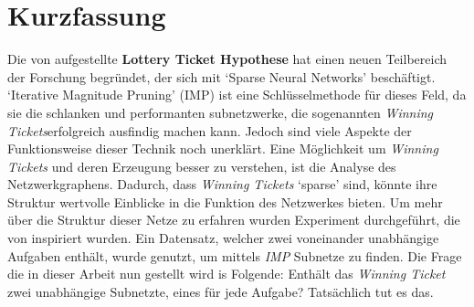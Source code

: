 \chapter*{Kurzfassung}

Die von \textcite{LTH} aufgestellte \textbf{Lottery Ticket Hypothese} hat einen neuen Teilbereich der Forschung begründet, der sich mit `Sparse Neural Networks' beschäftigt.
`Iterative Magnitude Pruning' (IMP) ist eine Schlüsselmethode für dieses Feld, da sie die schlanken und performanten subnetzwerke, die sogenannten \textit{Winning Tickets}erfolgreich ausfindig machen kann.
Jedoch sind viele Aspekte der Funktionsweise dieser Technik noch unerklärt.
Eine Möglichkeit um \textit{Winning Tickets} und deren Erzeugung besser zu verstehen, ist die Analyse des Netzwerkgraphens.
Dadurch, dass \textit{Winning Tickets} `sparse' sind, könnte ihre Struktur wertvolle Einblicke in die Funktion des Netzwerkes bieten.
Um mehr über die Struktur dieser Netze zu erfahren wurden Experiment durchgeführt, die von \textcite{BIMT} inspiriert wurden.
Ein Datensatz, welcher zwei voneinander unabhängige Aufgaben enthält, wurde genutzt, um mittels \textit{IMP} Subnetze zu finden.
Die Frage die in dieser Arbeit nun gestellt wird is Folgende:
Enthält das \textit{Winning Ticket} zwei unabhängige Subnetzte, eines für jede Aufgabe?
Tatsächlich tut es das.